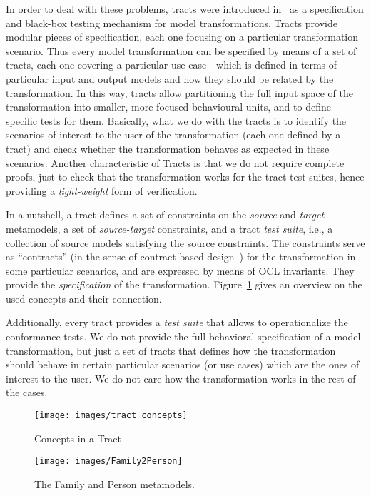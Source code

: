 In order to deal with these problems, tracts were introduced in~\cite{TRACTS11} as a specification and black-box testing mechanism for model transformations.
Tracts provide modular pieces of specification, each one focusing on a particular transformation scenario. Thus every model transformation can be specified by means of a set of tracts, each one covering a particular use
case---which is defined in terms of particular input and output models and how
they should be related by the transformation. In this way, tracts allow
partitioning the full input space of the transformation into smaller, more focused
behavioural units, and to define specific tests for them. Basically, what we do
with the tracts is to identify the scenarios of interest to the user of the
transformation (each one defined by a tract) and check
whether the transformation behaves as expected in these scenarios.
Another characteristic of Tracts is that we do not require complete proofs,
just to check that the transformation works for the tract test suites, hence
providing a \emph{light-weight} form of verification.

In a nutshell, a tract defines a set of constraints on the \emph{source} and
\emph{target} metamodels, a set of \emph{source-target} constraints, and a
tract \emph{test suite}, i.e., a collection of source models satisfying the
source constraints. The constraints serve as ``contracts'' (in the sense of
contract-based design~\cite{Meyer92}) for the transformation in some particular
scenarios, and are expressed by means of OCL invariants. They provide the
\emph{specification} of the transformation. Figure~\ref{fig:TMT}
gives an overview on the used concepts and their connection.

Additionally, every tract provides a \emph{test suite} that allows to
operationalize the conformance tests. We do not provide the full behavioral
specification of a model transformation, but just a set of tracts that defines
how the transformation should behave in certain particular scenarios (or use
cases) which are the ones of interest to the user. We do not care how the
transformation works in the rest of the cases.

\begin{figure}[t]
\centering
\texttt{[image: images/tract\_concepts]}
\caption{Concepts in a Tract}
\label{fig:TMT}
\end{figure}

\begin{figure}[t]
\centering
\texttt{[image: images/Family2Person]}
\caption{The Family and Person metamodels.}
\label{fig:Family2PersonsMM}
\end{figure}

